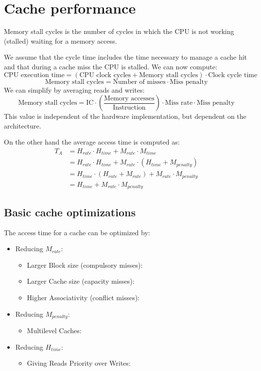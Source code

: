 \section{Cache performance}

\begin{definition}
    Memory stall cycles is the number of cycles in which the CPU is not working (stalled) waiting for a memory access. 
\end{definition}
We assume that the cycle time includes the time necessary to manage a cache hit and that during a cache miss the CPU is stalled. 
We can now compute: 
\[\text{CPU execution time}=\left(\text{CPU clock cycles}+\text{Memory stall cycles} \right) \cdot \text{Clock cycle time}\]
\[\text{Memory stall cycles}=\text{Number of misses} \cdot \text{Miss penalty}\]
We can simplify by averaging reads and writes: 
\[\text{Memory stall cycles} = \text{IC} \cdot (\dfrac{\text{Memory accesses}}{\text{Instruction}})\cdot \text{Miss rate} \cdot \text{Miss penalty}\]
This value is independent of the hardware implementation, but dependent on the architecture. 

On the other hand the average access time is computed as: 
\begin{align*}
    T_A &= H_{rate} \cdot H_{time}+ M_{rate} \cdot M_{time} \\
        &= H_{rate} \cdot H_{time}+ M_{rate} \cdot \left( H_{time}+M_{penalty} \right) \\
        &= H_{time} \cdot \left(H_{rate} + M_{rate}\right) + M_{rate} \cdot M_{penalty} \\
        &= H_{time} + M_{rate} \cdot M_{penalty}
\end{align*}

\subsection{Basic cache optimizations}
The access time for a cache can be optimized by: 
\begin{itemize}
    \item Reducing $M_{rate}$: 
        \begin{itemize}
            \item Larger Block size (compulsory misses): 
            \item Larger Cache size (capacity misses): 
            \item Higher Associativity (conflict misses): 
        \end{itemize}
    \item Reducing $M_{penalty}$: 
        \begin{itemize}
            \item Multilevel Caches: 
        \end{itemize}
    \item Reducing $H_{time}$: 
        \begin{itemize}
            \item Giving Reads Priority over Writes: 
        \end{itemize}
\end{itemize}

